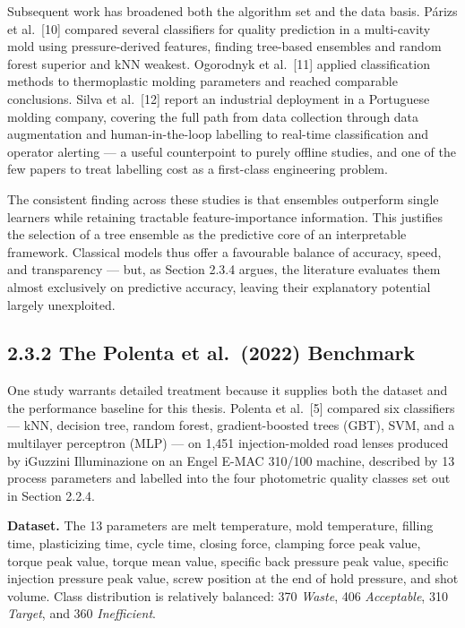 Subsequent work has broadened both the algorithm set and the data basis. Párizs et al.~{[}10{]} compared several classifiers for quality prediction in a multi-cavity mold using pressure-derived features, finding tree-based ensembles and random forest superior and kNN weakest. Ogorodnyk et al.~{[}11{]} applied classification methods to thermoplastic molding parameters and reached comparable conclusions. Silva et al.~{[}12{]} report an industrial deployment in a Portuguese molding company, covering the full path from data collection through data augmentation and human-in-the-loop labelling to real-time classification and operator alerting --- a useful counterpoint to purely offline studies, and one of the few papers to treat labelling cost as a first-class engineering problem.

The consistent finding across these studies is that ensembles outperform single learners while retaining tractable feature-importance information. This justifies the selection of a tree ensemble as the predictive core of an interpretable framework. Classical models thus offer a favourable balance of accuracy, speed, and transparency --- but, as Section 2.3.4 argues, the literature evaluates them almost exclusively on predictive accuracy, leaving their explanatory potential largely unexploited.

\hypertarget{the-polenta-et-al.-2022-benchmark}{%
\subsection{2.3.2 The Polenta et al.~(2022) Benchmark}\label{the-polenta-et-al.-2022-benchmark}}

One study warrants detailed treatment because it supplies both the dataset and the performance baseline for this thesis. Polenta et al.~{[}5{]} compared six classifiers --- kNN, decision tree, random forest, gradient-boosted trees (GBT), SVM, and a multilayer perceptron (MLP) --- on 1,451 injection-molded road lenses produced by iGuzzini Illuminazione on an Engel E-MAC 310/100 machine, described by 13 process parameters and labelled into the four photometric quality classes set out in Section 2.2.4.

\textbf{Dataset.} The 13 parameters are melt temperature, mold temperature, filling time, plasticizing time, cycle time, closing force, clamping force peak value, torque peak value, torque mean value, specific back pressure peak value, specific injection pressure peak value, screw position at the end of hold pressure, and shot volume. Class distribution is relatively balanced: 370 \emph{Waste}, 406 \emph{Acceptable}, 310 \emph{Target}, and 360 \emph{Inefficient}.

